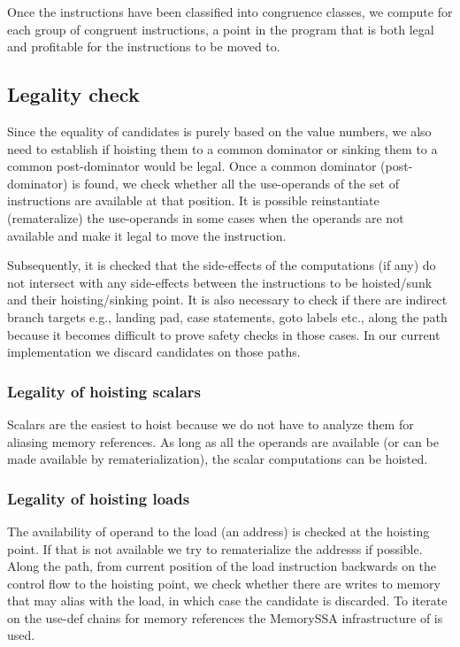 \documentclass[acmlarge,review]{acmart}\settopmatter{printfolios=true}
\begin{document}
Once the instructions have been classified into congruence classes, we compute
for each group of congruent instructions, a point in the program that is both
legal and profitable for the instructions to be moved to.

\subsection{Legality check}
\label{subsec:legality}
Since the equality of candidates is purely based on the value numbers, we also
need to establish if hoisting them to a common dominator or sinking them to a
common post-dominator would be legal. Once a common dominator (post-dominator)
is found, we check whether all the use-operands of the set of instructions are
available at that position. It is possible reinstantiate (remateralize) the
use-operands in some cases when the operands are not available and make it legal
to move the instruction.

Subsequently, it is checked that the side-effects of the computations (if any)
do not intersect with any side-effects between the instructions to be
hoisted/sunk and their hoisting/sinking point. It is also necessary to check if
there are indirect branch targets e.g., landing pad, case statements, goto
labels etc., along the path because it becomes difficult to prove safety checks
in those cases. In our current implementation we discard candidates on those
paths.

\subsubsection{Legality of hoisting scalars}
Scalars are the easiest to hoist because we do not have to analyze them for
aliasing memory references. As long as all the operands are available (or can be
made available by rematerialization), the scalar computations can be hoisted.

\subsubsection{Legality of hoisting loads}
The availability of operand to the load (an address) is checked at the hoisting
point. If that is not available we try to rematerialize the addresss if
possible.  Along the path, from current position of the load instruction
backwards on the control flow to the hoisting point, we check whether there are
writes to memory that may alias with the load, in which case the candidate is
discarded. To iterate on the use-def chains for memory references the MemorySSA
infrastructure of \LLVM{} is used.
\end{document}

